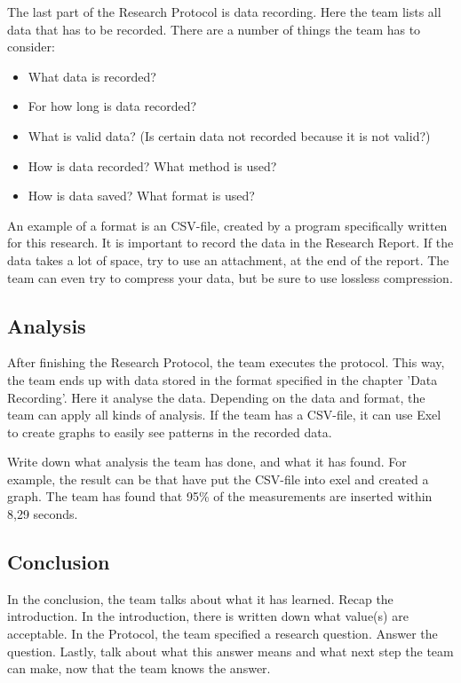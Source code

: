\documentclass[10pt]{report}
\begin{document}
The last part of the Research Protocol is data recording. Here the team lists all data that has to be recorded. There are a number of things the team has to consider:

\begin{itemize}
	\item What data is recorded?
	\item For how long is data recorded?
	\item What is valid data? (Is certain data not recorded because it is not valid?)
	\item How is data recorded? What method is used?
	\item How is data saved? What format is used?
\end{itemize}

An example of a format is an CSV-file, created by a program specifically written for this research. It is important to record the data in the Research Report. If the data takes a lot of space, try to use an attachment, at the end of the report. The team can even try to compress your data, but be sure to use lossless compression.

\subsection{Analysis}

After finishing the Research Protocol, the team executes the protocol. This way, the team ends up with data stored in the format specified in the chapter 'Data Recording'. Here it analyse the data. Depending on the data and format, the team can apply all kinds of analysis. If the team has a CSV-file, it can use Exel to create graphs to easily see patterns in the recorded data.

Write down what analysis the team has done, and what it has found. For example, the result can be that have put the CSV-file into exel and created a graph. The team has found that 95\% of the measurements are inserted within 8,29 seconds.

\subsection{Conclusion}

In the conclusion, the team talks about what it has learned. Recap the introduction. In the introduction, there is written down what value(s) are acceptable. In the Protocol, the team specified a research question. Answer the question. Lastly, talk about what this answer means and what next step the team can make, now that the team knows the answer.
\end{document}
